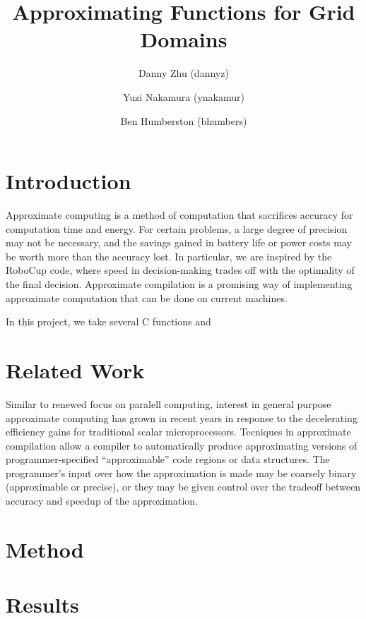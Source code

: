 \documentclass{article}
\begin{document}
\title{Approximating Functions for Grid Domains}
\author{Danny Zhu (dannyz) \and Yuzi Nakamura (ynakamur) \and Ben Humberston (bhumbers)}

\maketitle

\section{Introduction}

Approximate computing is a method of computation that sacrifices accuracy for computation time and energy. For certain problems, a large degree of precision may not be necessary, and the savings gained in battery life or power costs may be worth more than the accuracy lost. In particular, we are inspired by the RoboCup code, where speed in decision-making trades off with the optimality of the final decision. Approximate compilation is a promising way of implementing approximate computation that can be done on current machines.

In this project, we take several C functions and

\section{Related Work}
Similar to renewed focus on paralell computing, interest in general purpose approximate computing has grown in recent years in response to the decelerating efficiency gains for traditional scalar microprocessors. Tecniques in approximate compilation allow a compiler to automatically produce approximating versions of programmer-specified ``approximable'' code regions or data structures. The programmer's input over how the approximation is made may be coarsely binary (approximable or precise), or they may be given control over the tradeoff between accuracy and speedup of the approximation.

\cite{Agarwal09} \cite{Sampson11} \cite{Esmaeilzadeh12} \cite{Venkataramani13} \cite{Amant14}

\section{Method}

\section{Results}



\end{document}
